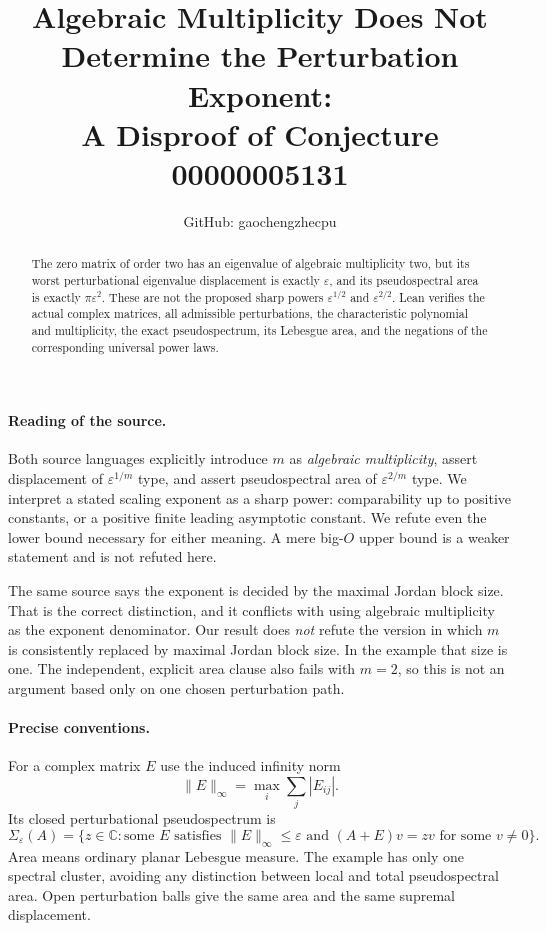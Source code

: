 \documentclass[11pt]{article}
\title{Algebraic Multiplicity Does Not Determine the Perturbation Exponent:\\A Disproof of Conjecture 00000005131}
\author{GitHub: gaochengzhecpu}
\date{}
\begin{document}
\maketitle
\begin{abstract}
The zero matrix of order two has an eigenvalue of algebraic multiplicity
two, but its worst perturbational eigenvalue displacement is exactly
$\varepsilon$, and its pseudospectral area is exactly
$\pi\varepsilon^2$. These are not the proposed sharp powers
$\varepsilon^{1/2}$ and $\varepsilon^{2/2}$. Lean verifies the actual
complex matrices, all admissible perturbations, the characteristic
polynomial and multiplicity, the exact pseudospectrum, its Lebesgue
area, and the negations of the corresponding universal power laws.
\end{abstract}

\paragraph{Reading of the source.}
Both source languages explicitly introduce $m$ as \emph{algebraic
multiplicity}, assert displacement of $\varepsilon^{1/m}$ type, and
assert pseudospectral area of $\varepsilon^{2/m}$ type. We interpret a
stated scaling exponent as a sharp power: comparability up to positive
constants, or a positive finite leading asymptotic constant. We refute
even the lower bound necessary for either meaning. A mere big-$O$
upper bound is a weaker statement and is not refuted here.

The same source says the exponent is decided by the maximal Jordan
block size. That is the correct distinction, and it conflicts with
using algebraic multiplicity as the exponent denominator. Our result
does \emph{not} refute the version in which $m$ is consistently replaced
by maximal Jordan block size. In the example that size is one. The
independent, explicit area clause also fails with $m=2$, so this is
not an argument based only on one chosen perturbation path.

\paragraph{Precise conventions.}
For a complex matrix $E$ use the induced infinity norm
\[
 \|E\|_\infty=\max_i\sum_j |E_{ij}|.
\]
Its closed perturbational pseudospectrum is
\[
 \Sigma_\varepsilon(A)=
 \{z\in\mathbb C:\text{some }E\text{ satisfies }
 \|E\|_\infty\le\varepsilon\text{ and }(A+E)v=zv
 \text{ for some }v\ne0\}.
\]
Area means ordinary planar Lebesgue measure. The example has only one
spectral cluster, avoiding any distinction between local and total
pseudospectral area. Open perturbation balls give the same area and
the same supremal displacement.
\end{document}
